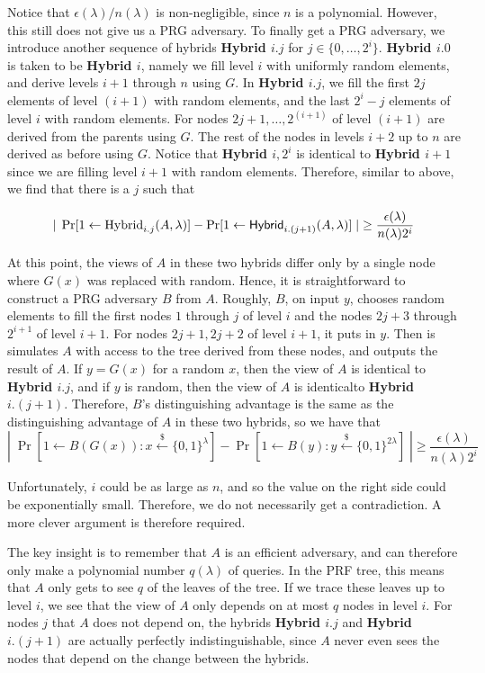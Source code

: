 Notice that $\epsilon(\lambda)/n(\lambda)$ is non-negligible, since $n$ is a polynomial.  However, this still does not give us a PRG adversary.  To finally get a PRG adversary, we introduce another sequence of hybrids {\bf Hybrid $i.j$} for $j\in\{0,\dots,2^i\}$.  {\bf Hybrid $i.0$} is taken to be {\bf Hybrid $i$}, namely we fill level $i$ with uniformly random elements, and derive levels $i+1$ through $n$ using $G$.  In {\bf Hybrid $i.j$}, we fill the first $2j$ elements of level $(i+1)$ with random elements, and the last $2^i-j$ elements of level $i$ with random elements.  For nodes $2j+1,\dots,2^(i+1)$ of level $(i+1)$ are derived from the parents using $G$.  The rest of the nodes in levels $i+2$ up to $n$ are derived as before using $G$.  Notice that {\bf Hybrid $i,2^i$} is identical to {\bf Hybrid $i+1$} since we are filling level $i+1$ with random elements.  Therefore, similar to above, we find that there is a $j$ such that

\[|\;\Pr[1\gets\text{Hybrid}_{i.j}(A,\lambda)]-\Pr[1\gets\text{\sf Hybrid}_{i.(j+1)}(A,\lambda)]\;|\geq \frac{\epsilon(\lambda)}{n(\lambda)2^i}\]

At this point, the views of $A$ in these two hybrids differ only by a single node where $G(x)$ was replaced with random.  Hence, it is straightforward to construct a PRG adversary $B$ from $A$.  Roughly, $B$, on input $y$, chooses random elements to fill the first nodes $1$ through $j$ of level $i$ and the nodes $2j+3$ through $2^{i+1}$ of level $i+1$.  For nodes $2j+1,2j+2$ of level $i+1$, it puts in $y$.  Then is simulates $A$ with access to the tree derived from these nodes, and outputs the result of $A$.  If $y=G(x)$ for a random $x$, then the view of $A$ is identical to {\bf Hybrid $i.j$}, and if $y$ is random, then the view of $A$ is identicalto {\bf Hybrid $i.(j+1)$}.  Therefore, $B$'s distinguishing advantage is the same as the distinguishing advantage of $A$ in these two hybrids, so we have that 
\[|\;\Pr[1\gets B(G(x)):x\stackrel{\$}{\gets}\{0,1\}^\lambda]-\Pr[1\gets B(y):y\stackrel{\$}{\gets}\{0,1\}^{2\lambda}]\;|\geq \frac{\epsilon(\lambda)}{n(\lambda)2^i}\]

Unfortunately, $i$ could be as large as $n$, and so the value on the right side could be exponentially small.  Therefore, we do not necessarily get a contradiction.  A more clever argument is therefore required.

The key insight is to remember that $A$ is an efficient adversary, and can therefore only make a polynomial number $q(\lambda)$ of queries.  In the PRF tree, this means that $A$ only gets to see $q$ of the leaves of the tree.  If we trace these leaves up to level $i$, we see that the view of $A$ only depends on at most $q$ nodes in level $i$.  For nodes $j$ that $A$ does not depend on, the hybrids {\bf Hybrid $i.j$} and {\bf Hybrid $i.(j+1)$} are actually perfectly indistinguishable, since $A$ never even sees the nodes that depend on the change between the hybrids.

